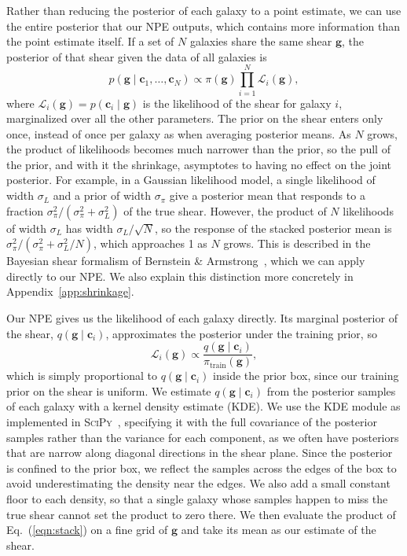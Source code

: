 Rather than reducing the posterior of each galaxy to a point estimate, we can use the entire posterior that our NPE outputs, which contains more information than the point estimate itself. If a set of $N$ galaxies share the same shear $\mathbf{g}$, the posterior of that shear given the data of all galaxies is
\begin{equation}
\label{eqn:stack}
    p(\mathbf{g} \mid \mathbf{c}_1, \dots, \mathbf{c}_N) \propto \pi(\mathbf{g}) \prod_{i=1}^{N} \mathcal{L}_i(\mathbf{g}),
\end{equation}
where $\mathcal{L}_i(\mathbf{g}) = p(\mathbf{c}_i \mid \mathbf{g})$ is the likelihood of the shear for galaxy $i$, marginalized over all the other parameters. The prior on the shear enters only once, instead of once per galaxy as when averaging posterior means. As $N$ grows, the product of likelihoods becomes much narrower than the prior, so the pull of the prior, and with it the shrinkage, asymptotes to having no effect on the joint posterior. For example, in a Gaussian likelihood model, a single likelihood of width $\sigma_L$ and a prior of width $\sigma_\pi$ give a posterior mean that responds to a fraction $\sigma_\pi^2/(\sigma_\pi^2 + \sigma_L^2)$ of the true shear. However, the product of $N$ likelihoods of width $\sigma_L$ has width $\sigma_L/\sqrt{N}$, so the response of the stacked posterior mean is $\sigma_\pi^2/(\sigma_\pi^2 + \sigma_L^2/N)$, which approaches 1 as $N$ grows. This is described in the Bayesian shear formalism of Bernstein \& Armstrong~\citep{BA14}, which we can apply directly to our NPE. We also explain this distinction more concretely in Appendix~\ref{app:shrinkage}.

Our NPE gives us the likelihood of each galaxy directly. Its marginal posterior of the shear, $q(\mathbf{g} \mid \mathbf{c}_i)$, approximates the posterior under the training prior, so
\begin{equation}
\label{eqn:npe-likelihood}
    \mathcal{L}_i(\mathbf{g}) \propto \frac{q(\mathbf{g} \mid \mathbf{c}_i)}{\pi_\mathrm{train}(\mathbf{g})},
\end{equation}
which is simply proportional to $q(\mathbf{g} \mid \mathbf{c}_i)$ inside the prior box, since our training prior on the shear is uniform. We estimate $q(\mathbf{g} \mid \mathbf{c}_i)$ from the posterior samples of each galaxy with a kernel density estimate (KDE). We use the KDE module as implemented in \textsc{SciPy}~\citep{SciPy}, specifying it with the full covariance of the posterior samples rather than the variance for each component, as we often have posteriors that are narrow along diagonal directions in the shear plane. Since the posterior is confined to the prior box, we reflect the samples across the edges of the box to avoid underestimating the density near the edges. We also add a small constant floor to each density, so that a single galaxy whose samples happen to miss the true shear cannot set the product to zero there. We then evaluate the product of Eq.~(\ref{eqn:stack}) on a fine grid of $\mathbf{g}$ and take its mean as our estimate of the shear.

